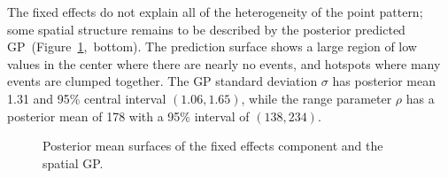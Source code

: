 \documentclass[]{interact}
\begin{document}
The fixed effects do not explain all of the heterogeneity of the point pattern;
some spatial structure remains to be described by the posterior predicted
GP~(Figure~\ref{beimean},~bottom). The prediction surface shows a large region
of low values in the center where there are nearly no events, and hotspots
where many events are clumped together. The GP standard deviation \(\sigma\)
has posterior mean 1.31 and 95\% central interval \((1.06, 1.65)\), while the
range parameter \(\rho\) has a posterior mean of 178 with a 95\% interval of
\((138, 234)\).

\begin{figure}[h]



\caption{Posterior mean surfaces of the fixed effects component and the
spatial GP.}
\label{beimean}
\end{figure}
\end{document}
